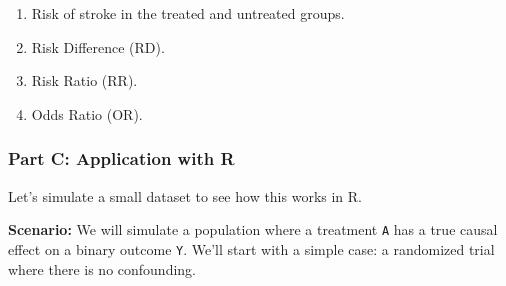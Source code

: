 \documentclass[
  10pt,
  letterpaper,
  DIV=11,
  numbers=noendperiod]{scrartcl}
\providecommand{\tightlist}{%
  \setlength{\itemsep}{0pt}\setlength{\parskip}{0pt}}
\begin{document}
\begin{enumerate}
\def\labelenumi{\arabic{enumi}.}
\tightlist
\item
  Risk of stroke in the treated and untreated groups.
\item
  Risk Difference (RD).
\item
  Risk Ratio (RR).
\item
  Odds Ratio (OR).
\end{enumerate}

\subsubsection{Part C: Application with
R}\label{part-c-application-with-r}

Let's simulate a small dataset to see how this works in R.

\textbf{Scenario:} We will simulate a population where a treatment
\texttt{A} has a true causal effect on a binary outcome \texttt{Y}.
We'll start with a simple case: a randomized trial where there is no
confounding.
\end{document}
